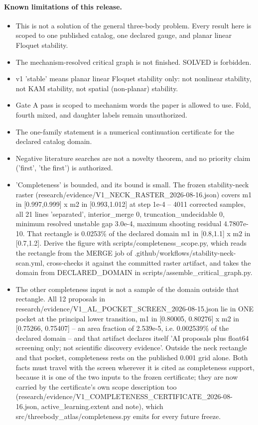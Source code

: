 \paragraph{Known limitations of this release.}
\begin{itemize}
\item This is not a solution of the general three-body problem. Every result here is scoped to one published catalog, one declared gauge, and planar linear Floquet stability.
\item The mechanism-resolved critical graph is not finished. SOLVED is forbidden.
\item v1 'stable' means planar linear Floquet stability only: not nonlinear stability, not KAM stability, not spatial (non-planar) stability.
\item Gate A pass is scoped to mechanism words the paper is allowed to use. Fold, fourth mixed, and daughter labels remain unauthorized.
\item The one-family statement is a numerical continuation certificate for the declared catalog domain.
\item Negative literature searches are not a novelty theorem, and no priority claim ('first', 'the first') is authorized.
\item 'Completeness' is bounded, and its bound is small. The frozen stability-neck raster (research/evidence/V1\_NECK\_RASTER\_2026-08-16.json) covers m1 in [0.997,0.999] x m2 in [0.993,1.012] at step 1e-4 -- 4011 corrected samples, all 21 lines 'separated', interior\_merge 0, truncation\_undecidable 0, minimum resolved unstable gap 3.0e-4, maximum shooting residual 4.7807e-10. That rectangle is 0.0253\% of the declared domain m1 in [0.8,1.1] x m2 in [0.7,1.2]. Derive the figure with scripts/completeness\_scope.py, which reads the rectangle from the MERGE job of .github/workflows/stability-neck-scan.yml, cross-checks it against the committed raster artifact, and takes the domain from DECLARED\_DOMAIN in scripts/assemble\_critical\_graph.py.
\item The other completeness input is not a sample of the domain outside that rectangle. All 12 proposals in research/evidence/V1\_AL\_POCKET\_SCREEN\_2026-08-15.json lie in ONE pocket at the principal lower transition, m1 in [0.80005, 0.80276] x m2 in [0.75266, 0.75407] -- an area fraction of 2.539e-5, i.e. 0.002539\% of the declared domain -- and that artifact declares itself 'AI proposals plus float64 screening only; not scientific discovery evidence'. Outside the neck rectangle and that pocket, completeness rests on the published 0.001 grid alone. Both facts must travel with the screen wherever it is cited as completeness support, because it is one of the two inputs to the frozen certificate; they are now carried by the certificate's own scope description too (research/evidence/V1\_COMPLETENESS\_CERTIFICATE\_2026-08-16.json, active\_learning.extent and note), which src/threebody\_atlas/completeness.py emits for every future freeze.

\end{itemize}
